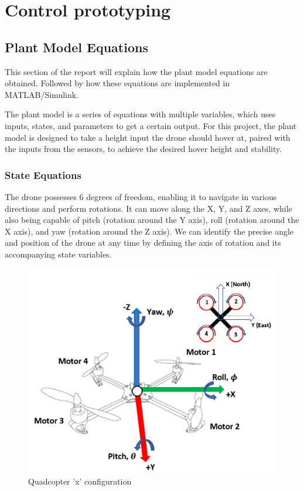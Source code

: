 \section{Control prototyping}
\subsection{Plant Model Equations}\label{plant_eq}
This section of the report will explain how the plant model equations are obtained. Followed by how these equations are implemented in MATLAB/Simulink.

The plant model is a series of equations with multiple variables, which uses inputs, states, and parameters to get a certain output. 
For this project, the plant model is designed to take a height input the drone should hover at, paired with the inputs from the sensors, to achieve the desired hover height and stability.

\subsubsection{State Equations}
The drone possesses 6 degrees of freedom, enabling it to navigate in various directions and perform rotations. It can move along the X, Y, and Z axes, while also being capable of pitch (rotation around the Y axis), roll (rotation around the X axis), and yaw (rotation around the Z axis). We can identify the precise angle and position of the drone at any time by defining the axis of rotation and its accompanying state variables.
\cite{Ferry}

\begin{figure}[H]
\begin{center}
    \includegraphics[scale =0.7]{pictures/control/drone directionals.png}
\end{center}
\caption{Quadcopter 'x' configuration \cite{Ferry}}
\end{figure}

